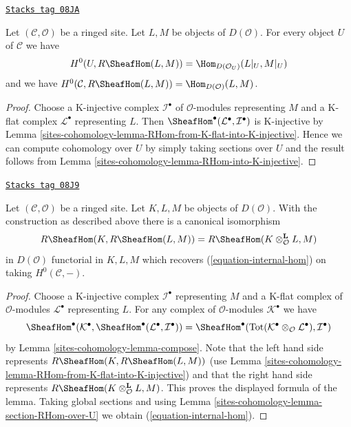 \begin{lemma}
\label{sites-cohomology-lemma-section-RHom-over-U}
\href{https://stacks.math.columbia.edu/tag/08JA}{\texttt{Stacks tag 08JA}}

Let $(\mathcal{C}, \mathcal{O})$ be a ringed site. Let $L, M$ be objects
of $D(\mathcal{O})$. For every object $U$ of $\mathcal{C}$ we have
$$
H^0(U, R\SheafHom(L, M)) =
\Hom_{D(\mathcal{O}_U)}(L|_U, M|_U)
$$
and we have $H^0(\mathcal{C}, R\SheafHom(L, M)) =
\Hom_{D(\mathcal{O})}(L, M)$.
\end{lemma}

\begin{proof}
Choose a K-injective complex $\mathcal{I}^\bullet$ of
$\mathcal{O}$-modules representing $M$ and a K-flat complex
$\mathcal{L}^\bullet$ representing $L$. Then
$\SheafHom^\bullet(\mathcal{L}^\bullet, \mathcal{I}^\bullet)$
is K-injective by Lemma \ref{sites-cohomology-lemma-RHom-from-K-flat-into-K-injective}.
Hence we can compute cohomology over $U$ by simply taking sections over $U$
and the result follows from Lemma \ref{sites-cohomology-lemma-RHom-into-K-injective}.
\end{proof}

\begin{lemma}
\label{sites-cohomology-lemma-internal-hom}
\href{https://stacks.math.columbia.edu/tag/08J9}{\texttt{Stacks tag 08J9}}

Let $(\mathcal{C}, \mathcal{O})$ be a ringed site. Let $K, L, M$ be objects
of $D(\mathcal{O})$. With the construction as described above
there is a canonical isomorphism
$$
R\SheafHom(K, R\SheafHom(L, M)) =
R\SheafHom(K \otimes_\mathcal{O}^\mathbf{L} L, M)
$$
in $D(\mathcal{O})$ functorial in $K, L, M$
which recovers (\ref{equation-internal-hom}) on taking $H^0(\mathcal{C}, -)$.
\end{lemma}

\begin{proof}
Choose a K-injective complex $\mathcal{I}^\bullet$ representing
$M$ and a K-flat complex of $\mathcal{O}$-modules $\mathcal{L}^\bullet$
representing $L$.
For any complex of $\mathcal{O}$-modules $\mathcal{K}^\bullet$
we have
$$
\SheafHom^\bullet(\mathcal{K}^\bullet,
\SheafHom^\bullet(\mathcal{L}^\bullet, \mathcal{I}^\bullet))
=
\SheafHom^\bullet(
\text{Tot}(\mathcal{K}^\bullet \otimes_\mathcal{O} \mathcal{L}^\bullet),
\mathcal{I}^\bullet)
$$
by Lemma \ref{sites-cohomology-lemma-compose}.
Note that the left hand side represents
$R\SheafHom(K, R\SheafHom(L, M))$ (use
Lemma \ref{sites-cohomology-lemma-RHom-from-K-flat-into-K-injective})
and that the right hand side represents
$R\SheafHom(K \otimes_\mathcal{O}^\mathbf{L} L, M)$.
This proves the displayed formula of the lemma.
Taking global sections and using Lemma \ref{sites-cohomology-lemma-section-RHom-over-U}
we obtain (\ref{equation-internal-hom}).
\end{proof}


